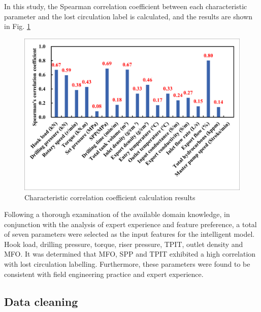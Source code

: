 \documentclass[journal,article,submit,pdftex,moreauthors]{Definitions/mdpi}
\begin{document}
In this study, the Spearman correlation coefficient between each characteristic parameter and the lost circulation label is calculated, and the results are shown in Fig.  \ref{fig:Characteristic correlation coefficient calculation results}

\begin{figure}[h]
    \centering
    \includegraphics[width=0.75\linewidth]{图片/spearman.png}
    \caption{Characteristic correlation coefficient calculation results}
    \label{fig:Characteristic correlation coefficient calculation results}
\end{figure}

Following a thorough examination of the available domain knowledge, in conjunction with the analysis of expert experience and feature preference, a total of seven parameters were selected as the input features for the intelligent model. Hook load, drilling pressure, torque, riser pressure, TPIT, outlet density and MFO. It was determined that MFO, SPP and TPIT exhibited a high correlation with lost circulation labelling. Furthermore, these parameters were found to be consistent with field engineering practice and expert experience.

\subsection{Data cleaning}
\end{document}

